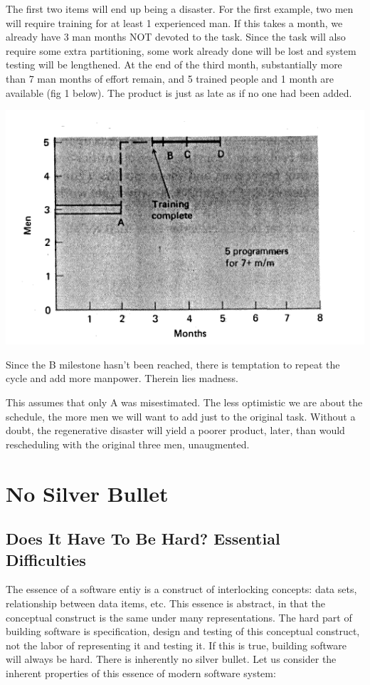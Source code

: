 \documentclass[letterpaper,12pt,parskip=full]{article}
\begin{document}
The first two items will end up being a disaster. For the first example, two men will require training for at least 1 experienced man. If this takes a month, we already have 3 man months NOT devoted to the task. Since the task will also require some extra partitioning, some work already done will be lost and system testing will be lengthened. At the end of the third month, substantially more than 7 man months of effort remain, and 5 trained people and 1 month are available (fig 1 below). The product is just as late as if no one had been added.

\includegraphics[scale=0.6]{MYTHICAL_MAN_MONTH_FIG_1.png}

Since the B milestone hasn’t been reached, there is temptation to repeat the cycle and add more manpower. Therein lies madness.

This assumes that only A  was misestimated. The less optimistic we are about the schedule, the more men we will want to add just to the original task. Without a doubt, the regenerative disaster will yield a poorer product, later, than would rescheduling with the original three men, unaugmented.

\newpage
\section{No Silver Bullet}

\subsection{Does It Have To Be Hard? Essential Difficulties}

The essence of a software entiy is a construct of interlocking concepts: data sets, relationship between data items, etc. This essence is abstract, in that the conceptual construct is the same under many representations. The hard part of building software is specification, design and testing of this conceptual construct, not the labor of representing it and testing it. If this is true, building software will always be hard. There is inherently no silver bullet. Let us consider the inherent properties of this essence of modern software system:
\end{document}
